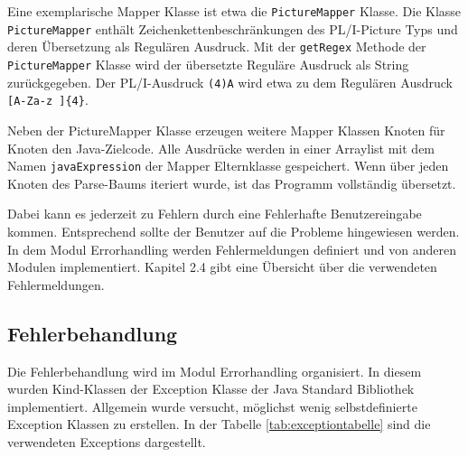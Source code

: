 Eine exemplarische Mapper Klasse ist etwa die \verb+PictureMapper+ Klasse.
Die Klasse \verb+PictureMapper+ enthält Zeichenkettenbeschränkungen des PL/I-Picture Typs und deren Übersetzung als Regulären Ausdruck.
Mit der \verb+getRegex+ Methode der \verb+PictureMapper+ Klasse wird der übersetzte Reguläre Ausdruck als String zurückgegeben.
Der PL/I-Ausdruck \verb+(4)A+ wird etwa zu dem Regulären Ausdruck \verb+[A-Za-z ]{4}+.   


Neben der PictureMapper Klasse erzeugen weitere Mapper Klassen Knoten für Knoten den Java-Zielcode. 
Alle Ausdrücke werden in einer Arraylist mit dem Namen \verb+javaExpression+ der Mapper Elternklasse  gespeichert.
Wenn über jeden Knoten des Parse-Baums iteriert wurde, ist das Programm vollständig übersetzt.


Dabei kann es jederzeit zu Fehlern durch eine Fehlerhafte Benutzereingabe kommen.
Entsprechend sollte der Benutzer auf die Probleme hingewiesen werden.
In dem Modul Errorhandling werden Fehlermeldungen definiert und von anderen Modulen implementiert. Kapitel 2.4 gibt eine Übersicht über die verwendeten Fehlermeldungen.

\pagebreak

\subsection{Fehlerbehandlung}
Die Fehlerbehandlung wird im Modul Errorhandling organisiert.
In diesem wurden Kind-Klassen der Exception Klasse der Java Standard Bibliothek implementiert.
Allgemein wurde versucht, möglichst wenig selbstdefinierte Exception Klassen zu erstellen.
In der Tabelle \ref{tab:exceptiontabelle} sind die verwendeten Exceptions dargestellt.

